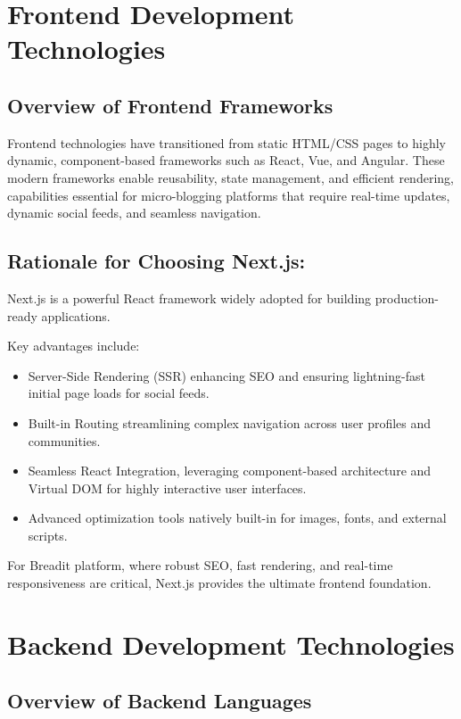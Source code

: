 \section{Frontend Development Technologies}

\subsection{Overview of Frontend Frameworks}

Frontend technologies have transitioned from static HTML/CSS pages to highly dynamic, component-based frameworks such as React, Vue, and Angular. These modern frameworks enable reusability, state management, and efficient rendering, capabilities essential for micro-blogging platforms that require real-time updates, dynamic social feeds, and seamless navigation.

\subsection{Rationale for Choosing Next.js:}

Next.js is a powerful React framework widely adopted for building production-ready applications.

Key advantages include:
\begin{itemize}
  \item Server-Side Rendering (SSR) enhancing SEO and ensuring lightning-fast initial page loads for social feeds.
  \item Built-in Routing streamlining complex navigation across user profiles and communities.
  \item Seamless React Integration, leveraging component-based architecture and Virtual DOM for highly interactive user interfaces.
  \item Advanced optimization tools natively built-in for images, fonts, and external scripts.
\end{itemize}

For Breadit platform, where robust SEO, fast rendering, and real-time responsiveness are critical, Next.js provides the ultimate frontend foundation.

\section{Backend Development Technologies}

\subsection{Overview of Backend Languages}

